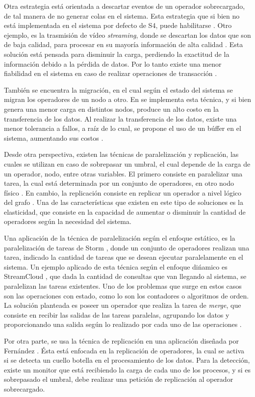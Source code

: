 Otra estrategia está orientada a descartar eventos de un operador sobrecargado, de tal manera de no generar colas en el sistema. Esta estrategia que si bien no está implementada en el sistema por defecto de S4, puede habilitarse \citep{s4}. Otro ejemplo, es la trasmisión de vídeo \textsl{streaming}, donde se descartan los datos que son de baja calidad, para procesar en su mayoría información de alta calidad \citep{SheuC09}. Esta solución está pensada para disminuir la carga, perdiendo la exactitud de la información debido a la pérdida de datos. Por lo tanto existe una menor fiabilidad en el sistema en caso de realizar operaciones de transacción \citep{bookDistrSys}.

También se encuentra la migración, en el cual según el estado del sistema se migran los operadores de un nodo a otro. En \citep{XingZH05} se implementa   esta técnica, y si bien genera una menor carga en distintos nodos, produce un alto costo en la transferencia de los datos. Al realizar la transferencia de los datos, existe una menor tolerancia a fallos, a raíz de lo cual, se propone el uso de un búffer en el sistema, aumentando sus costos \citep{PittauACA07}.

Desde otra perspectiva, existen las técnicas de paralelización y replicación, las cuales se utilizan en caso de sobrepasar un umbral, el cual depende de la carga de un operador, nodo, entre otras variables. El primero consiste en paralelizar una tarea, la cual está determinada por un conjunto de operadores, en otro nodo físico \citep{IshiiS11}. En cambio, la replicación consiste en replicar un operador a nivel lógico del grafo \citep{MadsenTZ14}. Una de las características que existen en este tipo de soluciones es la elasticidad, que consiste en la capacidad de aumentar o disminuir la cantidad de operadores según la necesidad del sistema.

Una aplicación de la técnica de paralelización según el enfoque estático, es la paralelización de tareas de Storm \citep{stormtwitterdoc}, donde un conjunto de operadores realizan una tarea, indicado la cantidad de tareas que se desean ejecutar paralelamente en el sistema. Un ejemplo aplicado de esta técnica según el enfoque dińamico es StreamCloud \citep{GulisanoJPSV12}, que dada la cantidad de consultas que van llegando al sistema, se paralelizan las tareas existentes. Uno de los problemas que surge en estos casos son las operaciones con estado, como lo son los contadores o algoritmos de orden. La solución planteada es poseer un operador que realiza la tarea de \textsl{merge}, que consiste en recibir las salidas de las tareas paralelas, agrupando los datos y proporcionando una salida según lo realizado por cada uno de las operaciones \citep{GedikSHW14}.

Por otra parte, se usa la técnica de replicación en una aplicación diseñada por Fernández \citep{FernandezMKP13}. Ésta está enfocada en la replicación de operadores, la cual se activa si se detecta un cuello botella en el procesamiento de los datos. Para la detección, existe un monitor que está recibiendo la carga de cada uno de los procesos, y si es sobrepasado el umbral, debe realizar una petición de replicación al operador sobrecargado.